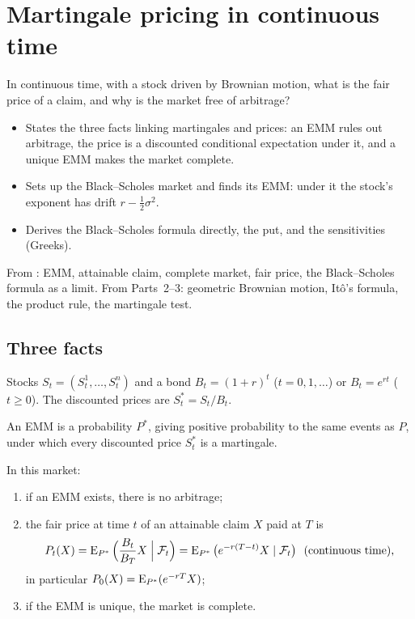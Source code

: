 \chapter{Martingale pricing in continuous time}
\label{ch:mg-pricing}

\begin{question}
In continuous time, with a stock driven by Brownian motion, what is the fair price of a claim, and why is the market free of arbitrage?
\end{question}

\begin{whatfor}
\begin{itemize}
  \item States the three facts linking martingales and prices: an EMM rules out arbitrage, the price is a discounted conditional expectation under it, and a unique EMM makes the market complete.
  \item Sets up the Black--Scholes market and finds its EMM: under it the stock's exponent has drift $r-\frac12\sigma^2$.
  \item Derives the Black--Scholes formula directly, the put, and the sensitivities (Greeks).
\end{itemize}
\end{whatfor}

\begin{prereq}
From : EMM, attainable claim, complete market, fair price, the Black--Scholes formula as a limit. From Parts~2--3: geometric Brownian motion, Itô's formula, the product rule, the martingale test.
\end{prereq}

\section{Three facts}

\begin{setup}
Stocks $S_t=(S_t^1,\dots,S_t^n)$ and a bond $B_t=(1+r)^t$ ($t=0,1,\dots$) or $B_t=e^{rt}$ ($t\ge0$). The discounted prices are $S_t^*=S_t/B_t$.
\end{setup}

An EMM is a probability $P^*$, giving positive probability to the same events as $P$, under which every discounted price $S_t^*$ is a martingale.

\begin{theorem}
\label{thm:three-facts}
In this market:
\begin{enumerate}[label=(\arabic*)]
  \item if an EMM exists, there is no arbitrage;
  \item the fair price at time $t$ of an attainable claim $X$ paid at $T$ is
  \[
    P_t(X)=\E_{P^*}\Big(\frac{B_t}{B_T}X\Bigm|\F_t\Big)=\E_{P^*}\big(e^{-r(T-t)}X\given\F_t\big)\ \ (\text{continuous time}),
  \]
  in particular $P_0(X)=\operatorname{E}_{P^*}(e^{-rT}X)$;
  \item if the EMM is unique, the market is complete.
\end{enumerate}
\end{theorem}
\noproof

